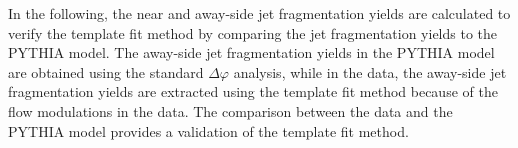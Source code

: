 \begin{table}[!b]
\caption{The scale factor $F$ for various multiplicity intervals in pp collisions (top) and p--Pb collisions (bottom), with 1~$<\it{p}_{\rm{T,trig}}<$~2~GeV/$c$ and 1~$<\it{p}_{\rm{T,assoc}}<$~4~GeV/$c$. The table reports statistical uncertainties only. Average systematic uncertainty of $F$ is about 3.8\% for both collision systems and multiplicity intervals.}
\centering
{}
\label{tab:FpppPb}
\end{table}

In the following, the near and away-side jet fragmentation yields are calculated to verify the template fit method by comparing the jet fragmentation yields to the PYTHIA model. The away-side jet fragmentation yields in the PYTHIA model are obtained using the standard $\Delta\varphi$ analysis, while in the data, the away-side jet fragmentation yields are extracted using the template fit method because of the flow modulations in the data. The comparison between the data and the PYTHIA model provides a validation of the template fit method. 

